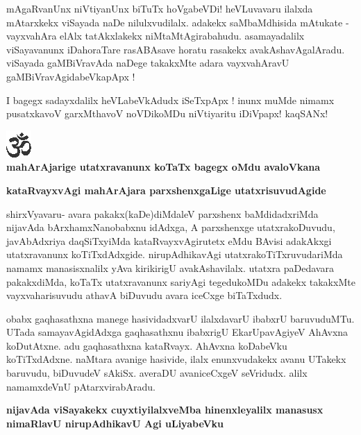 \noindent
mAgaRvanUnx niVtiyanUnx biTuTx hoVgabeVDi! heVLuvavaru ilalxda mAtarxkekx viSayada naDe nilulxvu\-dilalx. adakekx saMbaMdhisida mAtukate - vayxvahAra elAlx tatAkxlakekx niMtaMtAgirabahudu. asamayadalilx viSayavanunx iDahoraTare rasABAsave horatu rasakekx avakAshavAgalAradu. viSayada gaMBiVravAda naDege takakxMte adara vayxvahAravU gaMBiVravAgidabeVkapApx !

I bagegx sadayxdalilx heVLabeVkAdudx iSeTxpApx ! inunx muMde nimamx pusatxkavoV garxMthavoV noVDikoMDu niVtiyaritu iDiVpapx! kaqSANx!

\bigskip

\begin{center}
\includegraphics{om.eps}\\[12pt]
{\Large\bf{mahArAjarige utatxravanunx koTaTx bagegx oMdu avaloVkana}}
\end{center}

{\bigskip
\noindent
{\large\bf kataRvayxvAgi mahArAjara parxshenxgaLige utatxrisuvudAgide}}
\medskip

\noindent
shirxVyavaru- avara pakakx(kaDe)diMdaleV parxshenx baMdidadxriMda nijavAda bArxhamxNa\break\-nobabxnu idAdxga, A parxshenxge utatxrakoDuvudu, javAbAdxriya daqSiTxyiMda kataRvayx\-vAgirutetx eMdu BAvisi adakAkxgi utatxra\-vanunx koTiTxdAdxgide. nirupAdhikavAgi utatxrakoTiTxruvudariMda namamx manasisxnalilx yAva kirikirigU ava\-kAsha\-vilalx. utatxra paDedavara pakakxdiMda, koTaTx utatxravanunx  sariyAgi tegedukoMDu adakekx takakxMte vayxva\-harisu\-vudu athavA biDuvudu avara iceCxge biTaTxdudx.

obabx gaqhasathxna manege hasividadxvarU ilalxdavarU ibabxrU baruvuduMTu. UTada samayavAgi\-dAdxga gaqhasathxnu ibabxrigU EkarUpavAgiyeV AhAvxna koDutAtxne. adu gaqhasathxna kataRvayx. AhAvxna koDa\-beVku koTiTxdAdxne. naMtara avanige hasivide, ilalx enunxvudakekx avanu UTakekx baruvudu, biDu\-vudeV sAkiSx. averaDU avaniceCxgeV seVridudx. alilx namamxdeVnU pAtarxvirabAradu.

{\bigskip
\noindent
{\large\bf nijavAda viSayakekx cuyxtiyilalxveMba hinenxleyalilx manasusx nimaRlavU nirupAdhikavU Agi uLiya\-beVku}}\label{page250}
\medskip

